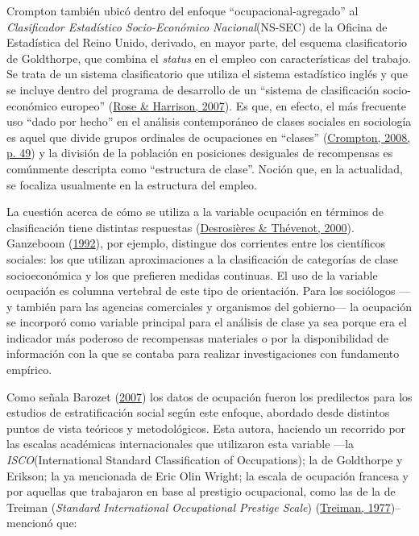 \documentclass[
]{article}
\begin{document}
Crompton también ubicó dentro del enfoque ``ocupacional-agregado'' al \emph{Clasificador Estadístico Socio-Económico Nacional}(NS-SEC) de la Oficina de Estadística del Reino Unido, derivado, en mayor parte, del esquema clasificatorio de Goldthorpe, que combina el \emph{status} en el empleo con características del trabajo. Se trata de un sistema clasificatorio que utiliza el sistema estadístico inglés y que se incluye dentro del programa de desarrollo de un ``sistema de clasificación socio-económico europeo'' (\protect\hyperlink{ref-Rose2007}{Rose \& Harrison, 2007}). Es que, en efecto, el más frecuente uso ``dado por hecho'' en el análisis contemporáneo de clases sociales en sociología es aquel que divide grupos ordinales de ocupaciones en ``clases'' (\protect\hyperlink{ref-Crompton2008}{Crompton, 2008, p. 49}) y la división de la población en posiciones desiguales de recompensas es comúnmente descripta como ``estructura de clase''. Noción que, en la actualidad, se focaliza usualmente en la estructura del empleo.

La cuestión acerca de cómo se utiliza a la variable ocupación en términos de clasificación tiene distintas respuestas (\protect\hyperlink{ref-Desrosieres2000}{Desrosières \& Thévenot, 2000}). Ganzeboom (\protect\hyperlink{ref-Ganzeboom1992}{1992}), por ejemplo, distingue dos corrientes entre los científicos sociales: los que utilizan aproximaciones a la clasificación de categorías de clase socioeconómica y los que prefieren medidas continuas. El uso de la variable ocupación es columna vertebral de este tipo de orientación. Para los sociólogos ---y también para las agencias comerciales y organismos del gobierno--- la ocupación se incorporó como variable principal para el análisis de clase ya sea porque era el indicador más poderoso de recompensas materiales o por la disponibilidad de información con la que se contaba para realizar investigaciones con fundamento empírico.

Como señala Barozet (\protect\hyperlink{ref-Barozet2007}{2007}) los datos de ocupación fueron los predilectos para los estudios de estratificación social según este enfoque, abordado desde distintos puntos de vista teóricos y metodológicos. Esta autora, haciendo un recorrido por las escalas académicas internacionales que utilizaron esta variable ---la \emph{ISCO}(International Standard Classification of Occupations); la de Goldthorpe y Erikson; la ya mencionada de Eric Olin Wright; la escala de ocupación francesa y por aquellas que trabajaron en base al prestigio ocupacional, como las de la de Treiman (\emph{Standard International Occupational Prestige Scale}) (\protect\hyperlink{ref-Treiman1977}{Treiman, 1977})-- mencionó que:
\end{document}
